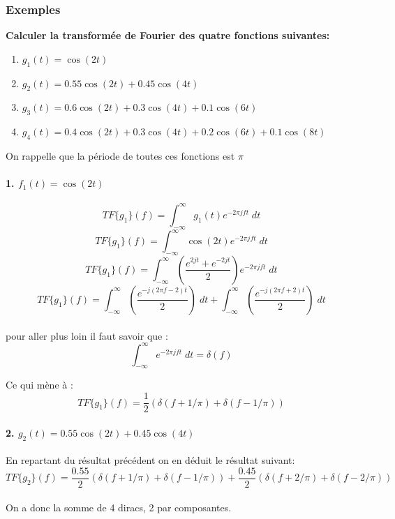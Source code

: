 \documentclass[11pt,a4paper]{article}
\begin{document}
\subsubsection{Exemples}
\textbf{Calculer la transformée de Fourier des quatre fonctions suivantes:}
\begin{enumerate}
\item $g_1(t) = \cos(2 t)$
\item $g_2(t) = 0.55 \cos(2 t) + 0.45 \cos(4 t)$
\item $g_3(t) = 0.6 \cos(2 t) + 0.3 \cos(4 t) + 0.1 \cos(6 t)$
\item $g_4(t) = 0.4 \cos(2 t) + 0.3 \cos(4 t) + 0.2 \cos(6 t) + 0.1 \cos(8 t) $
\end{enumerate} 
On rappelle que la période de toutes ces fonctions est $\pi$

\paragraph{1. $f_1(t) = \cos(2 t)$}
 \[TF\{ g_1 \}(f) = \int^{\infty}_{-\infty} g_1(t) e^{-2\pi j f t} \; dt\]
 \[TF\{ g_1 \}(f) = \int^{\infty}_{-\infty} \cos(2 t) e^{-2\pi j f t} \; dt\]
\[TF\{ g_1 \}(f) = \int^{\infty}_{-\infty} (\frac{e^{2jt} +  e^{-2jt}}{2}) e^{-2\pi j f t} \; dt\]
\[TF\{ g_1 \}(f) = \int^{\infty}_{-\infty} (\frac{e^{-j(2 \pi f -2)t}}{2}) \; dt + \int^{\infty}_{-\infty} (\frac{e^{-j(2 \pi f +2)t}}{2}) \; dt\]\\

pour aller plus loin il faut savoir que : \\

 \[\int^{\infty}_{-\infty}  e^{-2\pi j f t} \; dt = \delta(f)\]
 
Ce qui mène à :\\

\[TF\{ g_1 \}(f) = \frac{1}{2}(\delta(f+1/\pi) + \delta(f-1/\pi))\]

\paragraph{2. $g_2(t) = 0.55 \cos(2 t) + 0.45 \cos(4 t)$}
En repartant du résultat précédent on en déduit le résultat suivant:\\

\[TF\{ g_2 \}(f) = \frac{0.55}{2}(\delta(f+1/\pi) + \delta(f-1/\pi)) + \frac{0.45}{2}(\delta(f+2/\pi) + \delta(f-2/\pi))\]\\

On a donc la somme de 4 diracs, 2 par composantes.
\end{document}
